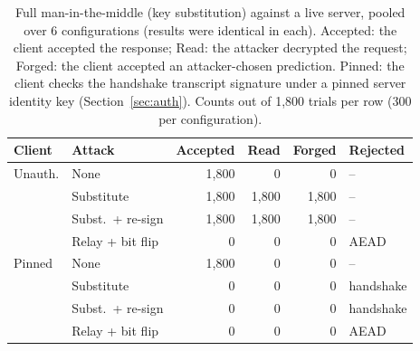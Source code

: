 \begin{table}[t]
\centering
\caption{Full man-in-the-middle (key substitution) against a live server, pooled over 6 configurations (results were identical in each). Accepted: the client accepted the response; Read: the attacker decrypted the request; Forged: the client accepted an attacker-chosen prediction. Pinned: the client checks the handshake transcript signature under a pinned server identity key (Section~\ref{sec:auth}). Counts out of 1,800 trials per row (300 per configuration).}
\label{tab:keysub}
\setlength{\tabcolsep}{1.6pt}
\footnotesize
\begin{tabular}{@{}llrrrl@{}}
\toprule
Client & Attack & Accepted & Read & Forged & Rejected \\
\midrule
Unauth. & None & 1,800 & 0 & 0 & -- \\
 & Substitute & 1,800 & 1,800 & 1,800 & -- \\
 & Subst.\ + re-sign & 1,800 & 1,800 & 1,800 & -- \\
 & Relay + bit flip & 0 & 0 & 0 & AEAD \\
\addlinespace
Pinned & None & 1,800 & 0 & 0 & -- \\
 & Substitute & 0 & 0 & 0 & handshake \\
 & Subst.\ + re-sign & 0 & 0 & 0 & handshake \\
 & Relay + bit flip & 0 & 0 & 0 & AEAD \\
\bottomrule
\end{tabular}
\end{table}
